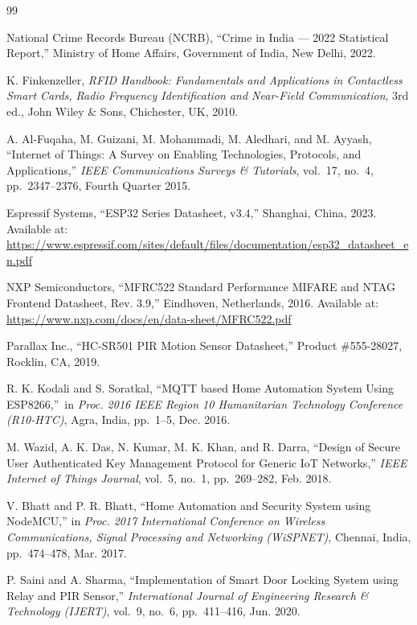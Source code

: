 \documentclass[12pt,a4paper]{article}
\begin{document}
\begin{thebibliography}{99}

National Crime Records Bureau (NCRB),
``Crime in India --- 2022 Statistical Report,''
Ministry of Home Affairs, Government of India,
New Delhi, 2022.

K. Finkenzeller,
\textit{RFID Handbook: Fundamentals and Applications in Contactless
Smart Cards, Radio Frequency Identification and Near-Field Communication},
3rd ed., John Wiley \& Sons, Chichester, UK, 2010.

A. Al-Fuqaha, M. Guizani, M. Mohammadi, M. Aledhari, and M. Ayyash,
``Internet of Things: A Survey on Enabling Technologies, Protocols, and Applications,''
\textit{IEEE Communications Surveys \& Tutorials}, vol.~17, no.~4,
pp.~2347--2376, Fourth Quarter 2015.

Espressif Systems,
``ESP32 Series Datasheet, v3.4,''
Shanghai, China, 2023.
Available at: \url{https://www.espressif.com/sites/default/files/documentation/esp32_datasheet_en.pdf}

NXP Semiconductors,
``MFRC522 Standard Performance MIFARE and NTAG Frontend Datasheet, Rev. 3.9,''
Eindhoven, Netherlands, 2016.
Available at: \url{https://www.nxp.com/docs/en/data-sheet/MFRC522.pdf}

Parallax Inc.,
``HC-SR501 PIR Motion Sensor Datasheet,''
Product \#555-28027, Rocklin, CA, 2019.

R. K. Kodali and S. Soratkal,
``MQTT based Home Automation System Using ESP8266,''\
in \textit{Proc. 2016 IEEE Region 10 Humanitarian Technology Conference (R10-HTC)},
Agra, India, pp.~1--5, Dec. 2016.

M. Wazid, A. K. Das, N. Kumar, M. K. Khan, and R. Darra,
``Design of Secure User Authenticated Key Management Protocol for Generic IoT Networks,''
\textit{IEEE Internet of Things Journal}, vol.~5, no.~1,
pp.~269--282, Feb. 2018.

V. Bhatt and P. R. Bhatt,
``Home Automation and Security System using NodeMCU,''
in \textit{Proc. 2017 International Conference on Wireless Communications,
Signal Processing and Networking (WiSPNET)}, Chennai, India, pp.~474--478, Mar. 2017.

P. Saini and A. Sharma,
``Implementation of Smart Door Locking System using Relay and PIR Sensor,''
\textit{International Journal of Engineering Research \& Technology (IJERT)},
vol.~9, no.~6, pp.~411--416, Jun. 2020.


\end{thebibliography}
\end{document}
